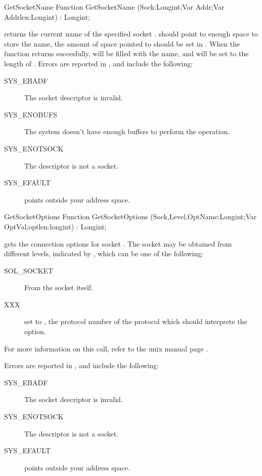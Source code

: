 \begin{function}{GetSocketName}
\Declaration
Function GetSocketName (Sock:Longint;Var Addr;Var Addrlen:Longint) : Longint;

\Description
{} returns the current name of the specified socket
.  should point to enough space to store the name, the
amount of space pointed to should be set in . 
When the function returns succesfully,  will be filled with the 
name, and  will be set to the length of .
\Errors
Errors are reported in , and include the following:
\begin{description}
\item[SYS\_EBADF] The socket descriptor is invalid.
\item[SYS\_ENOBUFS] The system doesn't have enough buffers to perform the
operation.
\item[SYS\_ENOTSOCK] The descriptor is not a socket.
\item[SYS\_EFAULT]  points outside your address space.
\end{description}

\SeeAlso
{}
\end{function}
\begin{function}{GetSocketOptions}
\Declaration
Function GetSocketOptions (Sock,Level,OptName:Longint;Var OptVal;optlen:longint) : Longint;

\Description
{} gets the connection options for socket .
The socket may be obtained from different levels, indicated by ,
which can be one of the following:
\begin{description}
\item[SOL\_SOCKET] From the socket itself. 
\item[XXX] set  to , the protocol number of the protocol
which should interprete the option.
 \end{description}
For more information on this call, refer to the unix manual page .

\Errors
Errors are reported in , and include the following:
\begin{description}
\item[SYS\_EBADF] The socket descriptor is invalid.
\item[SYS\_ENOTSOCK] The descriptor is not a socket.
\item[SYS\_EFAULT]  points outside your address space.
\end{description}

\SeeAlso
{}
\end{function}
